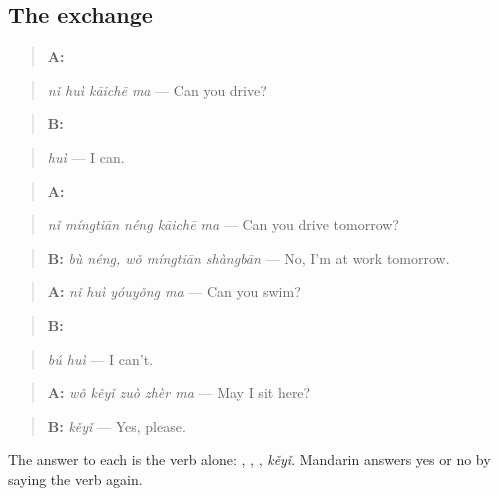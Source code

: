 \subsection*{The exchange}
\begin{quote}
\textbf{A:} 
\end{quote}

\begin{quote}
\emph{nǐ huì kāichē ma} — Can you drive?
\end{quote}

\begin{quote}
\textbf{B:} 
\end{quote}

\begin{quote}
\emph{huì} — I can.
\end{quote}

\begin{quote}
\textbf{A:} 
\end{quote}

\begin{quote}
\emph{nǐ míngtiān néng kāichē ma} — Can you drive tomorrow?
\end{quote}

\begin{quote}
\textbf{B:} \emph{bù néng, wǒ míngtiān shàngbān} — No, I'm at work tomorrow.
\end{quote}

\begin{quote}
\textbf{A:} \emph{nǐ huì yóuyǒng ma} — Can you swim?
\end{quote}

\begin{quote}
\textbf{B:} 
\end{quote}

\begin{quote}
\emph{bú huì} — I can't.
\end{quote}

\begin{quote}
\textbf{A:} \emph{wǒ kěyǐ zuò zhèr ma} — May I sit here?
\end{quote}

\begin{quote}
\textbf{B:} \emph{kěyǐ} — Yes, please.
\end{quote}

The answer to each is the verb alone: , , , \emph{kěyǐ}. Mandarin answers yes or no by saying the verb again.

